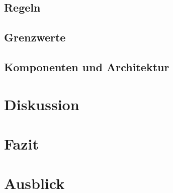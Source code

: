 \documentclass[a4paper,12pt]{scrartcl}
\begin{document}
\subsection{Regeln}
\subsection{Grenzwerte}
\subsection{Komponenten und Architektur}

\section{Diskussion}

\section{Fazit}

\section{Ausblick}

\newpage

\end{document}
